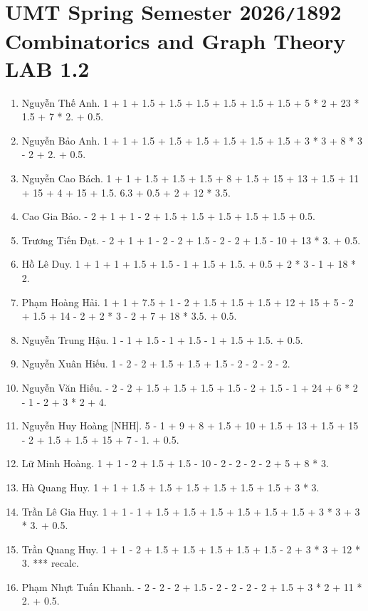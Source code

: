 \documentclass{article}
\begin{document}

\section{UMT Spring Semester 2026{\tt/}1892 Combinatorics and Graph Theory LAB 1.2}

\begin{enumerate}
	\item {\sc Nguyễn Thế Anh.} 1 + 1 + 1.5 + 1.5 + 1.5 + 1.5 + 1.5 + 1.5 + 5 * 2 + 23 * 1.5 + 7 * 2. + 0.5.
	\item {\sc Nguyễn Bảo Anh.} 1 + 1 + 1.5 + 1.5 + 1.5 + 1.5 + 1.5 + 1.5 + 3 * 3 + 8 * 3 - 2 + 2. + 0.5.
	\item {\sc Nguyễn Cao Bách.} 1 + 1 + 1.5 + 1.5 + 1.5 + 8 + 1.5 + 15 + 13 + 1.5 + 11 + 15 + 4 + 15 + 1.5. 6.3 + 0.5 + 2 + 12 * 3.5.
	\item {\sc Cao Gia Bảo.} - 2 + 1 + 1 - 2 + 1.5 + 1.5 + 1.5 + 1.5 + 1.5 + 0.5.
	\item {\sc Trương Tiến Đạt.} - 2 + 1 + 1 - 2 - 2 + 1.5 - 2 - 2 + 1.5 - 10 + 13 * 3. + 0.5.
	\item {\sc Hồ Lê Duy.} 1 + 1 + 1 + 1.5 + 1.5 - 1 + 1.5 + 1.5. + 0.5 + 2 * 3 - 1 + 18 * 2.
	\item {\sc Phạm Hoàng Hải.} 1 + 1 + 7.5 + 1 - 2 + 1.5 + 1.5 + 1.5 + 12 + 15 + 5 - 2 + 1.5 + 14 - 2 + 2 * 3 - 2 + 7 + 18 * 3.5. + 0.5.	
	\item {\sc Nguyễn Trung Hậu.} 1 - 1 + 1.5 - 1 + 1.5 - 1 + 1.5 + 1.5. + 0.5.
	\item {\sc Nguyễn Xuân Hiếu.} 1 - 2 - 2 + 1.5 + 1.5 + 1.5 - 2 - 2 - 2 - 2.
	\item {\sc Nguyễn Văn Hiếu.} - 2 - 2 + 1.5 + 1.5 + 1.5 + 1.5 - 2 + 1.5 - 1 + 24 + 6 * 2 - 1 - 2 + 3 * 2 + 4.
	\item {\sc Nguyễn Huy Hoàng [NHH].} 5 - 1 + 9 + 8 + 1.5 + 10 + 1.5 + 13 + 1.5 + 15 - 2 + 1.5 + 1.5 + 15 + 7 - 1. + 0.5.
	\item {\sc Lữ Minh Hoàng.} 1 + 1 - 2 + 1.5 + 1.5 - 10 - 2 - 2 - 2 - 2 + 5 + 8 * 3.
	\item {\sc Hà Quang Huy.} 1 + 1 + 1.5 + 1.5 + 1.5 + 1.5 + 1.5 + 1.5 + 3 * 3.
	\item {\sc Trần Lê Gia Huy.} 1 + 1 - 1 + 1.5 + 1.5 + 1.5 + 1.5 + 1.5 + 1.5 + 3 * 3 + 3 * 3. + 0.5.
	\item {\sc Trần Quang Huy.} 1 + 1 - 2 + 1.5 + 1.5 + 1.5 + 1.5 + 1.5 - 2 + 3 * 3 + 12 * 3. *** recalc.
	\item {\sc Phạm Nhựt Tuấn Khanh.} - 2 - 2 - 2 + 1.5 - 2 - 2 - 2 - 2 + 1.5 + 3 * 2 + 11 * 2. + 0.5.

\end{enumerate}
\end{document}
